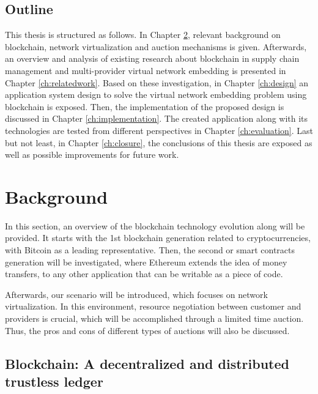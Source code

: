 \section{Outline}

This thesis is structured as follows. In Chapter \ref{ch:background}, relevant background on blockchain, network virtualization and auction mechanisms is given. Afterwards, an overview and analysis of existing research about blockchain in supply chain management and multi-provider virtual network embedding is presented in Chapter \ref{ch:relatedwork}. Based on these investigation, in Chapter \ref{ch:design} an application system design to solve the virtual network embedding problem using blockchain is exposed. Then, the implementation of the proposed design is discussed in Chapter \ref{ch:implementation}. The created application along with its technologies are tested from different perspectives in Chapter \ref{ch:evaluation}. Last but not least, in Chapter \ref{ch:closure}, the conclusions of this thesis are exposed as well as possible improvements for future work.


\chapter{Background}
\label{ch:background}

In this section, an overview of the blockchain technology evolution along will be provided. It starts with the 1st blockchain generation related to cryptocurrencies, with Bitcoin as a leading representative. Then, the second or smart contracts generation will be investigated, where Ethereum extends the idea of money transfers, to any other application that can be writable as a piece of code.

Afterwards, our scenario will be introduced, which focuses on network virtualization. In this environment, resource negotiation between customer and providers is crucial, which will be accomplished through a limited time auction. Thus, the pros and cons of different types of auctions will also be discussed.

\section{Blockchain: A decentralized and distributed trustless ledger}

